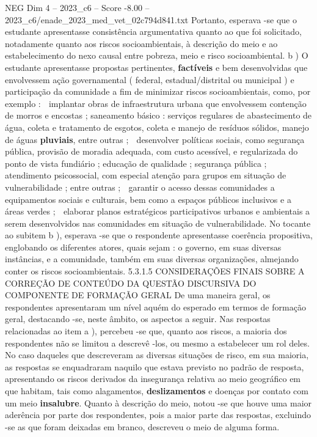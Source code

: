 \begin{textsample}{NEG Dim 4 – 2023\_c6 – Score -8.00 – 2023\_c6/enade\_2023\_med\_vet\_02c794d841.txt}
Portanto, esperava -se que o estudante apresentasse consistência argumentativa quanto ao que foi solicitado, notadamente quanto aos riscos socioambientais, à descrição do meio e ao estabelecimento do nexo causal entre pobreza, meio e risco socioambiental. b ) O estudante apresentasse propostas pertinentes, \textbf{factíveis} e bem desenvolvidas que envolvessem ação governamental ( federal, estadual/distrital ou municipal ) e participação da comunidade a fim de minimizar riscos socioambientais, como, por exemplo :  implantar obras de infraestrutura urbana que envolvessem contenção de morros e encostas ; saneamento básico : serviços regulares de abastecimento de água, coleta e tratamento de esgotos, coleta e manejo de resíduos sólidos, manejo de águas \textbf{pluviais}, entre outras ;  desenvolver políticas sociais, como segurança pública, provisão de moradia adequada, com custo acessível, e regularizada do ponto de vista fundiário ; educação de qualidade ; segurança pública ; atendimento psicossocial, com especial atenção para grupos em situação de vulnerabilidade ; entre outras ;  garantir o acesso dessas comunidades a equipamentos sociais e culturais, bem como a espaços públicos inclusivos e a áreas verdes ;  elaborar planos estratégicos participativos urbanos e ambientais a serem desenvolvidos nas comunidades em situação de vulnerabilidade.
No tocante ao subitem b ), esperava -se que o respondente apresentasse coerência propositiva, englobando os diferentes atores, quais sejam : o governo, em suas diversas instâncias, e a comunidade, também em suas diversas organizações, almejando conter os riscos socioambientais. 5.3.1.5 CONSIDERAÇÕES FINAIS SOBRE A CORREÇÃO DE CONTEÚDO DA QUESTÃO DISCURSIVA DO COMPONENTE DE FORMAÇÃO GERAL De uma maneira geral, os respondentes apresentaram um nível aquém do esperado em termos de formação geral, destacando -se, neste âmbito, os aspectos a seguir.
Nas respostas relacionadas ao item a ), percebeu -se que, quanto aos riscos, a maioria dos respondentes não se limitou a descrevê -los, ou mesmo a estabelecer um rol deles.
No caso daqueles que descreveram as diversas situações de risco, em sua maioria, as respostas se enquadraram naquilo que estava previsto no padrão de resposta, apresentando os riscos derivados da insegurança relativa ao meio geográfico em que habitam, tais como alagamentos, \textbf{deslizamentos} e doenças por contato com um meio \textbf{insalubre}.
Quanto à descrição do meio, notou -se que houve uma maior aderência por parte dos respondentes, pois a maior parte das respostas, excluindo -se as que foram deixadas em branco, descreveu o meio de alguma forma.

\end{textsample}
